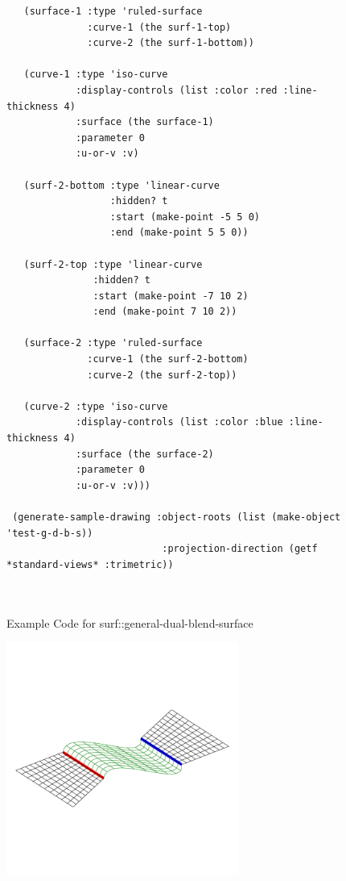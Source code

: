 \documentclass [11pt]{book}
\begin{document}
\begin{itemize}
\begin{figure}
\begin{lrbox}{\boxedverb}
\begin{minipage}{\linewidth}
{\begin{verbatim}
   (surface-1 :type 'ruled-surface
              :curve-1 (the surf-1-top)
              :curve-2 (the surf-1-bottom))
    
   (curve-1 :type 'iso-curve
            :display-controls (list :color :red :line-thickness 4)
            :surface (the surface-1)
            :parameter 0
            :u-or-v :v)
    
   (surf-2-bottom :type 'linear-curve
                  :hidden? t
                  :start (make-point -5 5 0)
                  :end (make-point 5 5 0))
    
   (surf-2-top :type 'linear-curve
               :hidden? t
               :start (make-point -7 10 2)
               :end (make-point 7 10 2))
    
   (surface-2 :type 'ruled-surface
              :curve-1 (the surf-2-bottom)
              :curve-2 (the surf-2-top))
    
   (curve-2 :type 'iso-curve
            :display-controls (list :color :blue :line-thickness 4)
            :surface (the surface-2)
            :parameter 0
            :u-or-v :v)))

 (generate-sample-drawing :object-roots (list (make-object 'test-g-d-b-s))
                           :projection-direction (getf *standard-views* :trimetric))

 
\end{verbatim}}
\end{minipage}
\end{lrbox}
\fbox{\usebox{\boxedverb}}

\caption{Example Code for surf::general-dual-blend-surface}

\label{fig:example-code-surf::general-dual-blend-surface}

\end{figure}

\begin{figure}
\begin{center}
\includegraphics[width=3in,height=3in]{../images/example-general-dual-blend-surface.pdf}
\end{center}


\end{figure}
\end{itemize}
\end{document}
